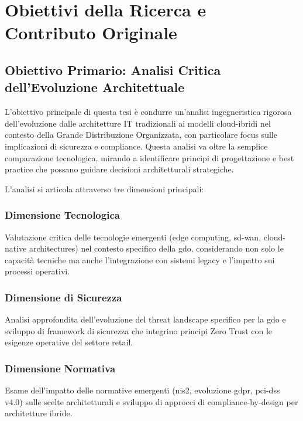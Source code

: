 \section{Obiettivi della Ricerca e Contributo Originale}
\label{sec:obiettivi-ricerca}

\subsection{Obiettivo Primario: Analisi Critica dell'Evoluzione Architettuale}
\label{subsec:obiettivo-primario}

L'obiettivo principale di questa tesi è condurre un'analisi ingegneristica rigorosa dell'evoluzione dalle architetture IT tradizionali ai modelli cloud-ibridi nel contesto della Grande Distribuzione Organizzata, con particolare focus sulle implicazioni di sicurezza e compliance. Questa analisi va oltre la semplice comparazione tecnologica, mirando a identificare principi di progettazione e best practice che possano guidare decisioni architetturali strategiche.

L'analisi si articola attraverso tre dimensioni principali:

\subsubsection{Dimensione Tecnologica}

Valutazione critica delle tecnologie emergenti (edge computing, \gls{sd-wan}, cloud-native architectures) nel contesto specifico della \gls{gdo}, considerando non solo le capacità tecniche ma anche l'integrazione con sistemi legacy e l'impatto sui processi operativi.

\subsubsection{Dimensione di Sicurezza}

Analisi approfondita dell'evoluzione del threat landscape specifico per la \gls{gdo} e sviluppo di framework di sicurezza che integrino principi Zero Trust con le esigenze operative del settore retail.

\subsubsection{Dimensione Normativa}

Esame dell'impatto delle normative emergenti (\gls{nis2}, evoluzione \gls{gdpr}, \gls{pci-dss} v4.0) sulle scelte architetturali e sviluppo di approcci di compliance-by-design per architetture ibride.

